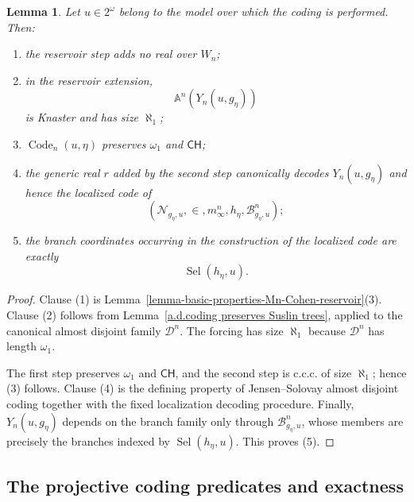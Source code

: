 \documentclass[a4paper,11pt]{article}
\newtheorem{lemma}[theorem]{Lemma}
\newcommand{\CH}{\mathsf{CH}}
\begin{document}
\begin{lemma}
\label{lemma-basic-properties-Mn-coding-forcing}
Let $u\in2^\omega$ belong to the model over which the coding is performed.
Then:
\begin{enumerate}
   \item the reservoir step adds no real over $W_n$;

   \item in the reservoir extension,
         \[
            \mathbb A^n(Y_n(u,g_\eta))
         \]
         is Knaster and has size $\aleph_1$;

   \item $\operatorname{Code}_n(u,\eta)$ preserves $\omega_1$ and $\CH$;

   \item the generic real $r$ added by the second step canonically decodes
         $Y_n(u,g_\eta)$ and hence the localized code of
         \[
            (\mathcal N_{g_\eta,u},\in,
             m^n_\infty,h_\eta,\mathcal B^n_{g_\eta,u});
         \]

   \item the branch coordinates occurring in the construction of the
         localized code are exactly
         \[
            \operatorname{Sel}(h_\eta,u).
         \]
\end{enumerate}
\end{lemma}

\begin{proof}
Clause (1) is
Lemma~\ref{lemma-basic-properties-Mn-Cohen-reservoir}(3).  Clause (2) follows
from Lemma~\ref{a.d.coding preserves Suslin trees}, applied to the canonical
almost disjoint family $\mathcal D^n$.  The forcing has size $\aleph_1$
because $\mathcal D^n$ has length $\omega_1$.

The first step preserves $\omega_1$ and $\CH$, and the second step is c.c.c.
of size $\aleph_1$; hence (3) follows.  Clause (4) is the defining property of
Jensen--Solovay almost disjoint coding together with the fixed localization
decoding procedure.  Finally, $Y_n(u,g_\eta)$ depends on the branch family only through
$\mathcal B^n_{g_\eta,u}$, whose members are precisely the branches indexed by
$\operatorname{Sel}(h_\eta,u)$.  This proves (5).
\end{proof}




\subsection{The projective coding predicates and exactness}
\label{subsection-projective-Mn-coding-predicates}
\end{document}
